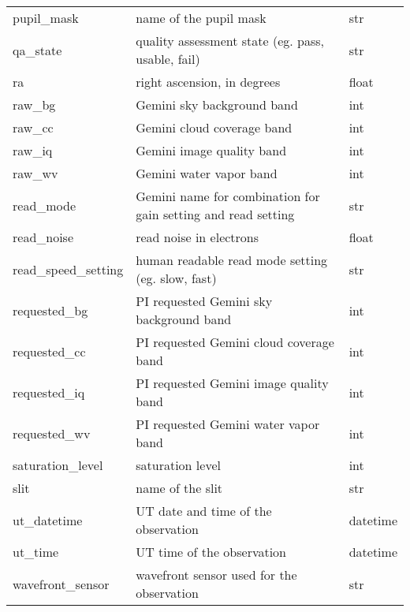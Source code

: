 \documentclass[letterpaper,10pt,english]{sphinxmanual}
\begin{document}
\begin{longtable}{|l|p{3.0in}|l|}
pupil\_mask
 & 
name of the pupil mask
 & 
str
\\

qa\_state
 & 
quality assessment state    (eg. pass, usable, fail)
 & 
str
\\

ra
 & 
right ascension, in degrees
 & 
float
\\

raw\_bg
 & 
Gemini sky background band
 & 
int
\\

raw\_cc
 & 
Gemini cloud coverage band
 & 
int
\\

raw\_iq
 & 
Gemini image quality band
 & 
int
\\

raw\_wv
 & 
Gemini water vapor band
 & 
int
\\

read\_mode
 & 
Gemini name for combination for gain setting and read setting
 & 
str
\\

read\_noise
 & 
read noise in electrons
 & 
float
\\

read\_speed\_setting
 & 
human readable read mode setting (eg. slow, fast)
 & 
str
\\

requested\_bg
 & 
PI requested Gemini sky background band
 & 
int
\\

requested\_cc
 & 
PI requested Gemini cloud coverage band
 & 
int
\\

requested\_iq
 & 
PI requested Gemini image quality band
 & 
int
\\

requested\_wv
 & 
PI requested Gemini water vapor band
 & 
int
\\

saturation\_level
 & 
saturation level
 & 
int
\\

slit
 & 
name of the slit
 & 
str
\\

ut\_datetime
 & 
UT date and time of the observation
 & 
datetime
\\

ut\_time
 & 
UT time of the observation
 & 
datetime
\\

wavefront\_sensor
 & 
wavefront sensor used for the observation
 & 
str
\\


\end{longtable}
\end{document}
